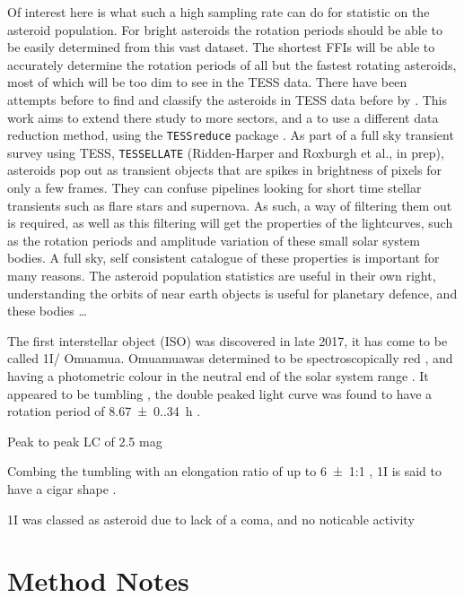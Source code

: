 \documentclass[12pt]{article}
\DeclareRobustCommand{\okina}{%
  \raisebox{\dimexpr\fontcharht\font`A-\height}{%
    \scalebox{0.8}{`}%
  }%
}
\newcommand{\omuamua}{\okina Omuamua}
\begin{document}
Of interest here is what such a high sampling rate can do for statistic on the asteroid population. 
For bright asteroids the rotation periods should be able to be easily determined from this vast dataset. 
The shortest FFIs will be able to accurately determine the rotation periods of all but the fastest rotating asteroids, most of which will be too dim to see in the TESS data. 
There have been attempts before to find and classify the asteroids in TESS data before by \citet{Pal2018, Pal2020}. This work aims to extend there study to more sectors, and a to use a different data reduction method, using the \texttt{TESSreduce} package \citep{Ridden-Harper2021}. 
As part of a full sky transient survey using TESS, \texttt{TESSELLATE} (Ridden-Harper and Roxburgh et al., in prep), asteroids pop out as transient objects that are spikes in brightness of pixels for only a few frames. 
They can confuse pipelines looking for short time stellar transients such as flare stars and supernova. 
As such, a way of filtering them out is required, as well as this filtering will get the properties of the lightcurves, such as the rotation periods and amplitude variation of these small solar system bodies.
A full sky, self consistent catalogue of these properties is important for many reasons. 
The asteroid population statistics are useful in their own right, understanding the orbits of near earth objects is useful for planetary defence, and these bodies \dots      


The first interstellar object (ISO) was discovered in late 2017, it has come to be called 1I/\omuamua \citep[see][for a review]{Bannister2019}.
\omuamua was determined to be spectroscopically red \citep{Fitzsimmons2017, Meech2017}, and having a photometric colour in the neutral end of the solar system range \citep{Bannister2017}. 
It appeared to be tumbling \citep[e.g.][]{Drahus2018,Fraser2018}, the double peaked light curve was found to have a rotation period of \qty{8.67(0.34)}{\hour} \citep{Belton2018}.

Peak to peak LC of 2.5 mag %

Combing the tumbling with an elongation ratio of up to \qty{6(1)}{}:1 \citep{McNeill2018}, 1I is said to have a cigar shape \citep{Belton2018}.  


1I was classed as asteroid due to lack of a coma, and no noticable activity %


\section{Method Notes}
\end{document}
